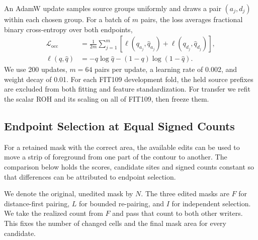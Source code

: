 \documentclass[journal]{IEEEtran}
\begin{document}
An AdamW update samples source groups uniformly and draws a pair \((a_j,d_j)\) within each chosen group. For a batch of \(m\) pairs, the loss averages fractional binary cross-entropy over both endpoints,
\begin{equation}
\begin{split}
 \mathcal L_{\mathrm{occ}}
   &= \frac{1}{2m}\sum_{j=1}^{m}
       \left[\ell(q_{a_j},\widehat q_{a_j})+
             \ell(q_{d_j},\widehat q_{d_j})\right],\\
 \ell(q,\hat q)&=-q\log\hat q-(1-q)\log(1-\hat q).
\end{split}
\label{eq:occ-loss}
\end{equation}
We use 200 updates, \(m=64\) pairs per update, a learning rate of 0.002, and weight decay of 0.01. For each FIT109 development fold, the held source prefixes are excluded from both fitting and feature standardization. For transfer we refit the scalar ROH and its scaling on all of FIT109, then freeze them.

\subsection{Endpoint Selection at Equal Signed Counts}
\label{sec:selection}

For a retained mask with the correct area, the available edits can be used to move a strip of foreground from one part of the contour to another. The comparison below holds the scores, candidate sites and signed counts constant so that differences can be attributed to endpoint selection.

We denote the original, unedited mask by \(N\). The three edited masks are \(F\) for distance-first pairing, \(L\) for bounded re-pairing, and \(I\) for independent selection. We take the realized count from \(F\) and pass that count to both other writers. This fixes the number of changed cells and the final mask area for every candidate.
\end{document}
